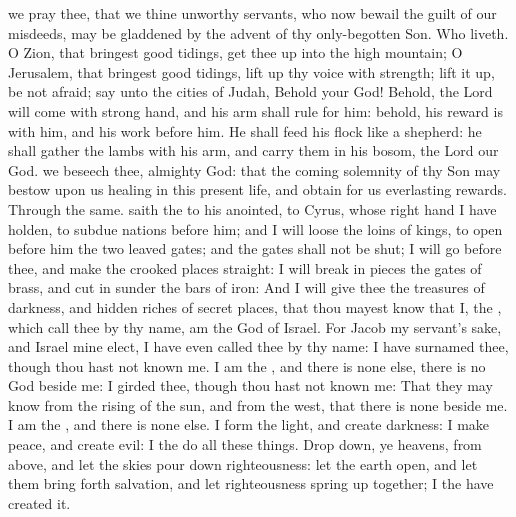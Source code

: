 \collect
{} we pray thee, that we thine unworthy servants, who now bewail the guilt of our misdeeds, may be gladdened by the advent of thy only-begotten Son. Who liveth.
 O Zion, that bringest good tidings, get thee up into the high mountain; O Jerusalem, that bringest good tidings, lift up thy voice with strength; lift it up, be not afraid; say unto the cities of Judah, Behold your God! Behold, the Lord  will come with strong hand, and his arm shall rule for him: behold, his reward is with him, and his work before him. He shall feed his flock like a shepherd: he shall gather the lambs with his arm, and carry them in his bosom,
the Lord our God.
\collect
{} we beseech thee, almighty God: that the coming solemnity of thy Son may bestow upon us healing in this present life, and obtain for us everlasting rewards. Through the same.
 saith the  to his anointed, to Cyrus, whose right hand I have holden, to subdue nations before him; and I will loose the loins of kings, to open before him the two leaved gates; and the gates shall not be shut; I will go before thee, and make the crooked places straight: I will break in pieces the gates of brass, and cut in sunder the bars of iron: And I will give thee the treasures of darkness, and hidden riches of secret places, that thou mayest know that I, the , which call thee by thy name, am the God of Israel. For Jacob my servant's sake, and Israel mine elect, I have even called thee by thy name: I have surnamed thee, though thou hast not known me. I am the , and there is none else, there is no God beside me: I girded thee, though thou hast not known me: That they may know from the rising of the sun, and from the west, that there is none beside me. I am the , and there is none else. I form the light, and create darkness: I make peace, and create evil: I the  do all these things. Drop down, ye heavens, from above, and let the skies pour down righteousness: let the earth open, and let them bring forth salvation, and let righteousness spring up together; I the  have created it.

